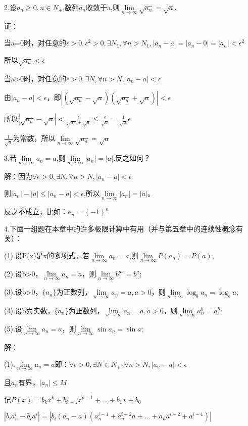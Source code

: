 \documentclass[12pt]{ctexart}
\begin{document}
2.设$a_n\ge0,n\in{N_+}$,数列$a_n$收敛于a,则$\lim\limits_{n\to\infty}\sqrt{a_n}=\sqrt{a}$.

证：

当a=0时，对任意的$\epsilon>0,\epsilon^2>0, \exists{N_1},\forall{n>N_1}, |a_n-a|=|a_n-0|=|a_n|<\epsilon^2$

所以$\sqrt{a_n}<\epsilon$

当a>0时，对任意的$\epsilon>0,\exists{N},\forall{}n>N,|a_n-a|<\epsilon$

由$|a_n-a|<\epsilon$，即$|(\sqrt{a_n}-\sqrt{a})(\sqrt{a_n}+\sqrt{a})|<\epsilon$

所以$|\sqrt{a_n}-\sqrt{a}|<\frac{\epsilon}{\sqrt{a_n}+\sqrt{a}}\le\frac{\epsilon}{\sqrt{a}}=\frac{1}{\sqrt{a}}\epsilon$

${\frac{1}{\sqrt{a}}}$为常数，所以$\lim\limits_{n\to\infty}\sqrt{a_n}=\sqrt{a}$

3.若$\lim\limits_{n\to\infty}a_n=a$,则$\lim\limits_{n\to\infty}|a_n|=|a|$.反之如何？

解：因为$\forall\epsilon>0,\exists{}N,\forall{}n>N,|a_n-a|<\epsilon$

则$|a_n|-|a|\le|a_n-a|<\epsilon$,所以$\lim\limits_{n\to\infty}|a_n|=|a|$。

反之不成立，比如：$a_n={(-1)}^n$

4.下面一组题在本章中的许多极限计算中有用（并与第五章中的连续性概念有关）：

(1).设P(x)是x的多项式。若$\lim\limits_{n\to\infty}a_n=a$,则$\lim\limits_{n\to\infty}P(a_n)=P(a)$;

(2).设b>0，$\lim\limits_{n\to\infty}a_n=a$，则$\lim\limits_{n\to\infty}b^{a_n}=b^a$;

(3).设b>0，$\{a_n\}$为正数列，$\lim\limits_{n\to\infty}a_n=a,a>0$，则$\lim\limits_{n\to\infty}\log_{b}a_n=\log_{b}a$;

(4).设b为实数，$\{a_n\}$为正数列，$\lim\limits_{n\to\infty}a_n=a,a>0$，则$\lim\limits_{n\to\infty}a_n^b=a^b$;

(5).设$\lim\limits_{n\to\infty}a_n=a$，则$\lim\limits_{n\to\infty}\sin{a_n}=\sin{a}$;

解：

(1).$\lim\limits_{n\to\infty}a_n=a\textrm{即：}\forall\epsilon>0,\exists{}N\in{N_+},\forall{}n>N,|a_n-a|<\epsilon$

且$a_n$有界，$|a_n|\le{M}$

记$P(x)=b_kx^k+{b_{k-1}x^{k-1}}+...+{b_{1}x}+b_0$

$|b_ia_n^i-b_ia^i|=|b_i(a_n-a)(a_n^{i-1}+a_n^{i-2}a+...+a_na^{i-2}+a^{i-1})|$
\end{document}
